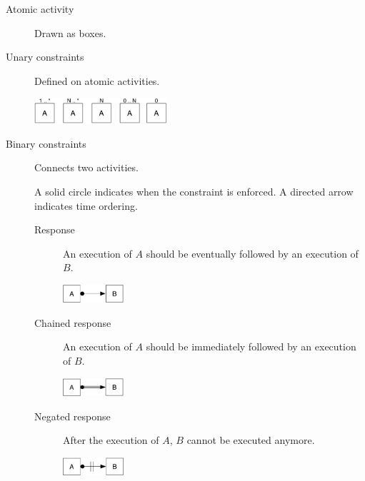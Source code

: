 \begin{description}
    \item[Atomic activity] 
        Drawn as boxes.
    
    \item[Unary constraints] 
        Defined on atomic activities.
        \begin{center}
            \includegraphics[width=0.4\textwidth]{img/declare_unary_constraint.png}
        \end{center}

    \item[Binary constraints] 
        Connects two activities.

        A solid circle indicates when the constraint is enforced.
        A directed arrow indicates time ordering.

        \begin{description}
            \item[Response] 
                An execution of $A$ should be eventually followed by an execution of $B$.
                \begin{center}
                    \includegraphics[width=0.2\textwidth]{img/declare_response.png}
                \end{center}

            \item[Chained response] 
                An execution of $A$ should be immediately followed by an execution of $B$.
                \begin{center}
                    \includegraphics[width=0.2\textwidth]{img/declare_chained_response.png}
                \end{center}

            \item[Negated response] 
                After the execution of $A$, $B$ cannot be executed anymore.
                \begin{center}
                    \includegraphics[width=0.2\textwidth]{img/declare_negated_response.png}
                \end{center}


\end{description}
\end{description}
